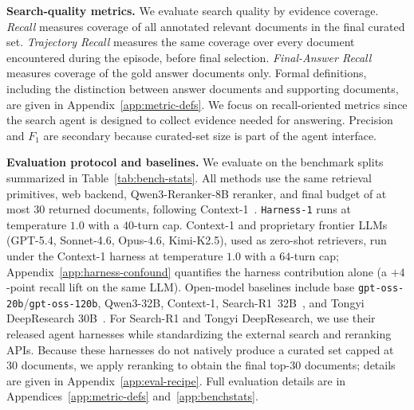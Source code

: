 \documentclass{article}
\newcommand{\sys}{\texttt{Harness-1}\xspace}
\begin{document}
\textbf{Search-quality metrics.}
We evaluate search quality by evidence coverage. \emph{Recall} measures
coverage of all annotated relevant documents in the final curated set.
\emph{Trajectory Recall} measures the same coverage over every document
encountered during the episode, before final selection. \emph{Final-Answer
Recall} measures coverage of the gold answer documents only. Formal
definitions, including the distinction between answer documents and supporting
documents, are given in Appendix~\ref{app:metric-defs}. We focus on
recall-oriented metrics since the search agent is designed to collect evidence
needed for answering. Precision and $F_1$ are secondary because curated-set size
is part of the agent interface.

\textbf{Evaluation protocol and baselines.}
We evaluate on the benchmark splits summarized in
Table~\ref{tab:bench-stats}. All methods use the same retrieval primitives,
web backend, Qwen3-Reranker-8B reranker, and final budget of at most
$30$ returned documents, following Context-1~\citep{bashir2026context1}.
\sys runs at temperature $1.0$ with a $40$-turn cap. Context-1 and proprietary
frontier LLMs (GPT-5.4, Sonnet-4.6, Opus-4.6, Kimi-K2.5), used as zero-shot
retrievers, run under the Context-1 harness at temperature $1.0$ with a
$64$-turn cap; Appendix~\ref{app:harness-confound} quantifies the harness
contribution alone (a $+4$-point recall lift on the same LLM).
Open-model baselines include base \texttt{gpt-oss-20b}/\texttt{gpt-oss-120b},
Qwen3-32B, Context-1, Search-R1~32B~\citep{jin2025searchr1}, and Tongyi
DeepResearch 30B~\citep{team2025tongyi}. For Search-R1 and Tongyi
DeepResearch, we use their released agent harnesses while standardizing the
external search and reranking APIs. Because these harnesses do not natively
produce a curated set capped at $30$ documents, we apply reranking to obtain the final top-$30$ documents; details are given in
Appendix~\ref{app:eval-recipe}. Full evaluation details are in
Appendices~\ref{app:metric-defs} and~\ref{app:benchstats}.
\end{document}
